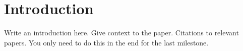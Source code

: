 \section{Introduction}

Write an introduction here. 
Give context to the paper. 
Citations to relevant papers. 
You only need to do this in the end for the last milestone.
   
